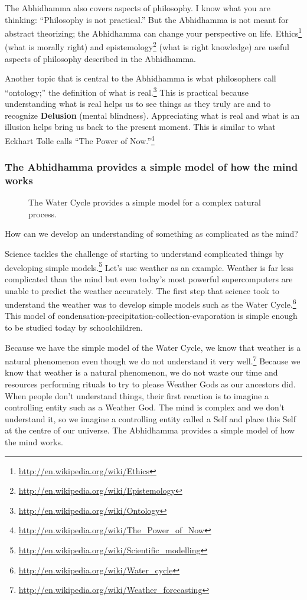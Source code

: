\pagebreak

The Abhidhamma also covers aspects of philosophy. I know what you are thinking: “Philosophy is not practical.” But the Abhidhamma is not meant for abstract theorizing; the Abhidhamma can change your perspective on life. Ethics\footnote{\url{http://en.wikipedia.org/wiki/Ethics}} (what is morally right) and epistemology\footnote{\url{http://en.wikipedia.org/wiki/Epistemology}} (what is right knowledge) are useful aspects of philosophy described in the Abhidhamma. 

Another topic that is central to the Abhidhamma is what philosophers call “ontology;” the definition of what is real.\footnote{\url{http://en.wikipedia.org/wiki/Ontology}} This is practical because understanding what is real helps us to see things as they truly are and to recognize \textbf{Delusion} (mental blindness). Appreciating what is real and what is an illusion helps bring us back to the present moment. This is similar to what Eckhart Tolle calls “The Power of Now.”\footnote{\url{http://en.wikipedia.org/wiki/The_Power_of_Now}}

\subsubsection*{The Abhidhamma provides a simple model of how the mind works}

\begin{figure}[H]
\centering

\caption{The Water Cycle provides a simple model for a complex natural process.}
\label{fig:Rain}
\end{figure}

How can we develop an understanding of something as complicated as the mind? 

Science tackles the challenge of starting to understand complicated things by developing simple models.\footnote{\url{http://en.wikipedia.org/wiki/Scientific_modelling}} Let’s use weather as an example. Weather is far less complicated than the mind but even today’s most powerful supercomputers are unable to predict the weather accurately. The first step that science took to understand the weather was to develop simple models such as the Water Cycle.\footnote{\url{http://en.wikipedia.org/wiki/Water_cycle}} This model of condensation-precipitation-collection-evaporation is simple enough to be studied today by schoolchildren.

Because we have the simple model of the Water Cycle, we know that weather is a natural phenomenon even though we do not understand it very well.\footnote{\url{http://en.wikipedia.org/wiki/Weather_forecasting}} Because we know that weather is a natural phenomenon, we do not waste our time and resources performing rituals to try to please Weather Gods as our ancestors did. When people don’t understand things, their first reaction is to imagine a controlling entity such as a Weather God. The mind is complex and we don’t understand it, so we imagine a controlling entity called a Self and place this Self at the centre of our universe. The Abhidhamma provides a simple model of how the mind works.

